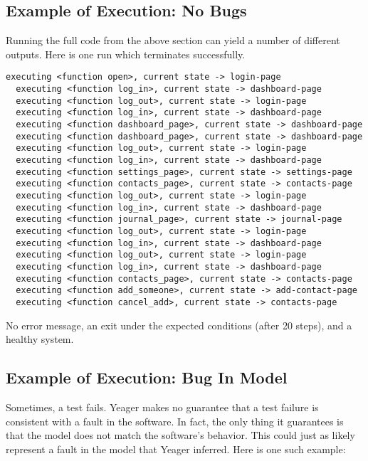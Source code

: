 \subsection{Example of Execution: No Bugs}
Running the full code from the above section can yield a number of different outputs. Here is one run which terminates successfully.

\begin{Verbatim}[fontsize=\small]
  executing <function open>, current state -> login-page
  executing <function log_in>, current state -> dashboard-page
  executing <function log_out>, current state -> login-page
  executing <function log_in>, current state -> dashboard-page
  executing <function dashboard_page>, current state -> dashboard-page
  executing <function dashboard_page>, current state -> dashboard-page
  executing <function log_out>, current state -> login-page
  executing <function log_in>, current state -> dashboard-page
  executing <function settings_page>, current state -> settings-page
  executing <function contacts_page>, current state -> contacts-page
  executing <function log_out>, current state -> login-page
  executing <function log_in>, current state -> dashboard-page
  executing <function journal_page>, current state -> journal-page
  executing <function log_out>, current state -> login-page
  executing <function log_in>, current state -> dashboard-page
  executing <function log_out>, current state -> login-page
  executing <function log_in>, current state -> dashboard-page
  executing <function contacts_page>, current state -> contacts-page
  executing <function add_someone>, current state -> add-contact-page
  executing <function cancel_add>, current state -> contacts-page
\end{Verbatim}

No error message, an exit under the expected conditions (after 20 steps), and a healthy system.

\subsection{Example of Execution: Bug In Model}
Sometimes, a test fails. Yeager makes no guarantee that a test failure is consistent with a fault in the software. In fact, the only thing it guarantees is that the model does not match the software's behavior. This could just as likely represent a fault in the model that Yeager inferred. Here is one such example:


